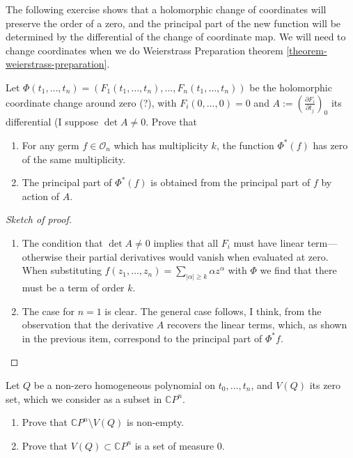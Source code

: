 The following exercise shows that a
holomorphic change of coordinates will
preserve the order of a zero, and the
principal part of the new function will be
determined by the differential of the change
of coordinate map. We will need to
change coordinates when we do Weierstrass
Preparation theorem
\ref{theorem-weierstrass-preparation}.

\begin{exercise}
\label{exercise-princ-part-under-coord}
Let
$\Phi(t_1,\ldots,t_n)=(F_1(t_1,\ldots,t_n),
\ldots,F_n(t_1,\ldots,t_n))$
be
the holomorphic coordinate change around zero
(?), with $F_i(0,\ldots,0)=0$ and
$A:=\left(\frac{\partial F_i}{\partial
t_j}\right)_0$ its differential (I suppose
$\det A \neq 0$. Prove that
\begin{enumerate}
\item For any germ $f\in \mathcal{O}_n$ which
has multiplicity $k$, the function
$\Phi^*(f)$ has zero of the same
multiplicity.
\item The principal part of $\Phi^*(f)$ is
obtained from the principal part of
$f$ by action of $A$.
\end{enumerate}
\end{exercise}

\begin{proof}[Sketch of proof]
\begin{enumerate}
\item The condition that $\det A \neq 0$
implies that all $F_i$ must have linear
term---otherwise their partial derivatives
would vanish when evaluated at zero.
When substituting
$f(z_1,\ldots,z_n)=\sum_{|\alpha|\geq
k}\alpha z^\alpha$ with
$\Phi$ we find that there must be a term of
order $k$.
\item The case for $n=1$ is clear. The
general case follows, I think, from the
observation that the derivative $A$ recovers
the linear terms, which, as shown
in the previous item, correspond to the
principal part of $\Phi^*f$.
\end{enumerate}
\end{proof}

\begin{exercise}
\label{exercise-zero-locus-homog-polyn}
Let $Q$ be a non-zero homogeneous polynomial
on $t_0,\ldots,t_n$, and $V(Q)$ its
zero set, which we consider as a subset in
$\mathbb{C}P^{n}$.
\begin{enumerate}
\item Prove that $\mathbb{C}P^{n}\setminus
V(Q)$ is non-empty.
\item Prove that $V(Q)\subset\mathbb{C}P^{n}$
is a set of measure 0.
\end{enumerate}
\end{exercise}


